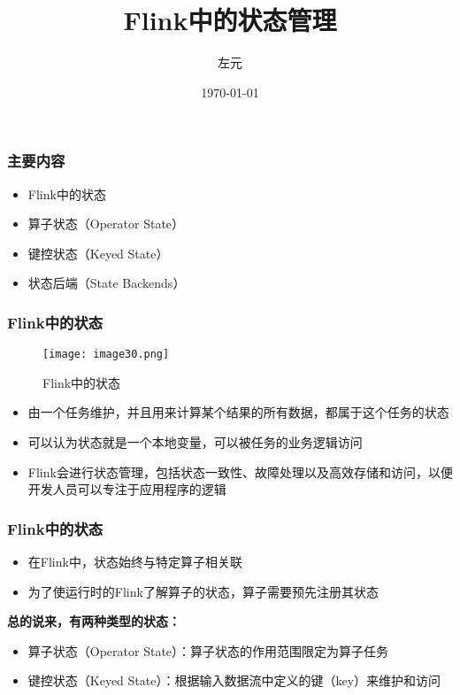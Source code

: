 \documentclass{beamer}
\title{Flink中的状态管理}
\date{\today}
\author{左元}
\institute{尚硅谷 大数据组}
\begin{document}
  \maketitle
  \begin{frame}
    \frametitle{主要内容}

    \begin{itemize}
        \item Flink中的状态
        \item 算子状态（Operator State）
        \item 键控状态（Keyed State）
        \item 状态后端（State Backends）
    \end{itemize}
  
  \end{frame}

  \begin{frame}
      \frametitle{Flink中的状态}

      \begin{figure}
        \centering
        \texttt{[image: image30.png]}
        \caption{Flink中的状态}
      \end{figure}
  
      \begin{itemize}
          \item 由一个任务维护，并且用来计算某个结果的所有数据，都属于这个任务的状态
          \item 可以认为状态就是一个本地变量，可以被任务的业务逻辑访问
          \item Flink会进行状态管理，包括状态一致性、故障处理以及高效存储和访问，以便开发人员可以专注于应用程序的逻辑
      \end{itemize}
  
  \end{frame}

  \begin{frame}
      \frametitle{Flink中的状态}
  
      \begin{itemize}
          \item 在Flink中，状态始终与特定算子相关联
          \item 为了使运行时的Flink了解算子的状态，算子需要预先注册其状态
      \end{itemize}

      \textbf{总的说来，有两种类型的状态：}

      \begin{itemize}
          \item 算子状态（Operator State）：算子状态的作用范围限定为算子任务
          \item 键控状态（Keyed State）：根据输入数据流中定义的键（key）来维护和访问
      \end{itemize}
  
  \end{frame}
\end{document}
